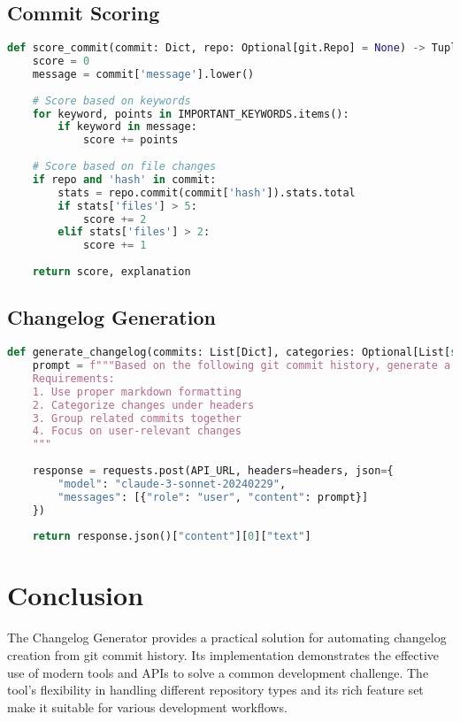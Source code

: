 \documentclass[sigconf]{acmart}
\begin{document}
\subsection{Commit Scoring}
\begin{lstlisting}[language=Python,caption=Commit Scoring Implementation]
def score_commit(commit: Dict, repo: Optional[git.Repo] = None) -> Tuple[int, str]:
    score = 0
    message = commit['message'].lower()
    
    # Score based on keywords
    for keyword, points in IMPORTANT_KEYWORDS.items():
        if keyword in message:
            score += points
            
    # Score based on file changes
    if repo and 'hash' in commit:
        stats = repo.commit(commit['hash']).stats.total
        if stats['files'] > 5:
            score += 2
        elif stats['files'] > 2:
            score += 1
            
    return score, explanation
\end{lstlisting}

\subsection{Changelog Generation}
\begin{lstlisting}[language=Python,caption=Changelog Generation with Claude API]
def generate_changelog(commits: List[Dict], categories: Optional[List[str]] = None) -> str:
    prompt = f"""Based on the following git commit history, generate a user-friendly changelog in markdown format.
    Requirements:
    1. Use proper markdown formatting
    2. Categorize changes under headers
    3. Group related commits together
    4. Focus on user-relevant changes
    """
    
    response = requests.post(API_URL, headers=headers, json={
        "model": "claude-3-sonnet-20240229",
        "messages": [{"role": "user", "content": prompt}]
    })
    
    return response.json()["content"][0]["text"]
\end{lstlisting}

\section{Conclusion}
The Changelog Generator provides a practical solution for automating changelog creation from git commit history. Its implementation demonstrates the effective use of modern tools and APIs to solve a common development challenge. The tool's flexibility in handling different repository types and its rich feature set make it suitable for various development workflows.
\end{document}
